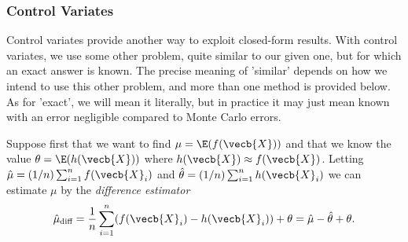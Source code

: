 \subsubsection{Control Variates}
Control variates provide another way to exploit closed-form results. With control variates, we use some other problem, quite similar to our given one, but for which an exact answer is known. The precise meaning of 'similar' depends on how we intend to use this other problem, and more than one method is provided below. As for 'exact', we will mean it literally, but in practice it may just mean known with an error negligible compared to Monte Carlo errors.

Suppose first that we want to find $\mu = \E(f(\vecb{X}))$ and that we know the value $\theta = \E(h(\vecb{X}))$ where $h(\vecb{X}) \approx f(\vecb{X})$. Letting $\hat{\mu} = (1/n)\sum_{i=1}^n f(\vecb{X}_i)$ and $\hat{\theta} = (1/n)\sum_{i=1}^n h(\vecb{X}_i)$ we can estimate $\mu$ by the \textit{difference estimator}
\begin{equation}
	\hat{\mu}_{\text{diff}} = \frac{1}{n} \sum_{i=1}^n (f(\vecb{X}_i) - h(\vecb{X}_i)) + \theta = \hat{\mu} - \hat{\theta} + \theta.
	\label{eq:DifferenceEstimator}
\end{equation}

